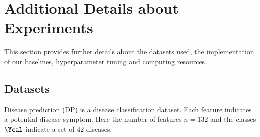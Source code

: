 \documentclass[letterpaper]{article}
\begin{document}
 
\newpage

\section{Additional Details about Experiments}
\label{app:setup}
This section provides further details about the datasets used, the implementation of our baselines, hyperparameter tuning and computing resources.

\subsection{Datasets}
\begin{table}[!htb]
    \centering
\caption{Dataset statistics}
\label{table:dataset}
\end{table}
 Disease prediction (DP) is a disease classification
dataset. Each feature indicates a potential disease symptom. Here the number of features $n=132$ and the classes $\Ycal$ indicate a set of $42$ diseases.  
\end{document}

